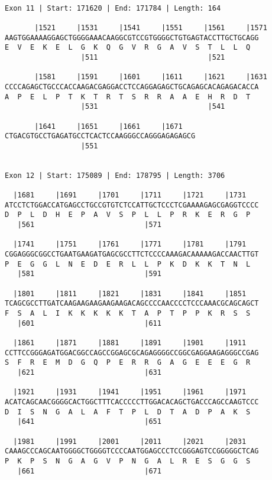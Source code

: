 \documentclass{article}
\begin{document}
\begin{Verbatim}
 
Exon 11 | Start: 171620 | End: 171784 | Length: 164
 
       |1521     |1531     |1541     |1551     |1561     |1571
AAGTGGAAAAGGAGCTGGGGAAACAAGGCGTCCGTGGGGCTGTGAGTACCTTGCTGCAGG
E  V  E  K  E  L  G  K  Q  G  V  R  G  A  V  S  T  L  L  Q  
                  |511                          |521        
  
       |1581     |1591     |1601     |1611     |1621     |1631
CCCCAGAGCTGCCCACCAAGACGAGGACCTCCAGGAGAGCTGCAGAGCACAGAGACACCA
A  P  E  L  P  T  K  T  R  T  S  R  R  A  A  E  H  R  D  T  
                  |531                          |541        
  
       |1641     |1651     |1661     |1671   
CTGACGTGCCTGAGATGCCTCACTCCAAGGGCCAGGGAGAGAGCG
                  |551                       
  
 
Exon 12 | Start: 175089 | End: 178795 | Length: 3706
 
  |1681     |1691     |1701     |1711     |1721     |1731   
ATCCTCTGGACCATGAGCCTGCCGTGTCTCCATTGCTCCCTCGAAAAGAGCGAGGTCCCC
D  P  L  D  H  E  P  A  V  S  P  L  L  P  R  K  E  R  G  P  
   |561                          |571                       
  
  |1741     |1751     |1761     |1771     |1781     |1791   
CGGAGGGCGGCCTGAATGAAGATGAGCGCCTTCTCCCCAAAGACAAAAAGACCAACTTGT
P  E  G  G  L  N  E  D  E  R  L  L  P  K  D  K  K  T  N  L  
   |581                          |591                       
  
  |1801     |1811     |1821     |1831     |1841     |1851   
TCAGCGCCTTGATCAAGAAGAAGAAGAAGACAGCCCCAACCCCTCCCAAACGCAGCAGCT
F  S  A  L  I  K  K  K  K  K  T  A  P  T  P  P  K  R  S  S  
   |601                          |611                       
  
  |1861     |1871     |1881     |1891     |1901     |1911   
CCTTCCGGGAGATGGACGGCCAGCCGGAGCGCAGAGGGGCCGGCGAGGAAGAGGGCCGAG
S  F  R  E  M  D  G  Q  P  E  R  R  G  A  G  E  E  E  G  R  
   |621                          |631                       
  
  |1921     |1931     |1941     |1951     |1961     |1971   
ACATCAGCAACGGGGCACTGGCTTTCACCCCCTTGGACACAGCTGACCCAGCCAAGTCCC
D  I  S  N  G  A  L  A  F  T  P  L  D  T  A  D  P  A  K  S  
   |641                          |651                       
  
  |1981     |1991     |2001     |2011     |2021     |2031   
CAAAGCCCAGCAATGGGGCTGGGGTCCCCAATGGAGCCCTCCGGGAGTCCGGGGGCTCAG
P  K  P  S  N  G  A  G  V  P  N  G  A  L  R  E  S  G  G  S  
   |661                          |671                       
  

\end{Verbatim}
\end{document}
